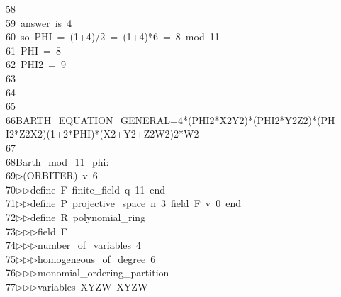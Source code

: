 \begin{tabbing}
58\>\\[0pt]
59\>\ answer\ is\ 4\\[0pt]
60\>\ so\ PHI\ =\ (1+4)/2\ =\ (1+4)*6\ =\ 8\ mod\ 11\\[0pt]
61\>\ PHI\ =\ 8\\[0pt]
62\>\ PHI2\ =\ 9\\[0pt]
63\>\\[0pt]
64\>\\[0pt]
65\>\\[0pt]
66\>BARTH\_EQUATION\_GENERAL=4*(PHI2*X2Y2)*(PHI2*Y2Z2)*(PH\\[0pt]
\>I2*Z2X2)(1+2*PHI)*(X2+Y2+Z2W2)2*W2\\[0pt]
67\>\\[0pt]
68\>Barth\_mod\_11\_phi:\\[0pt]
69\>$\triangleright$\>(ORBITER)\ v\ 6\ \\[0pt]
70\>$\triangleright$\>$\triangleright$\>define\ F\ finite\_field\ q\ 11\ end\ \\[0pt]
71\>$\triangleright$\>$\triangleright$\>define\ P\ projective\_space\ n\ 3\ field\ F\ v\ 0\ end\ \\[0pt]
72\>$\triangleright$\>$\triangleright$\>define\ R\ polynomial\_ring\ \\[0pt]
73\>$\triangleright$\>$\triangleright$\>$\triangleright$\>field\ F\ \\[0pt]
74\>$\triangleright$\>$\triangleright$\>$\triangleright$\>number\_of\_variables\ 4\ \\[0pt]
75\>$\triangleright$\>$\triangleright$\>$\triangleright$\>homogeneous\_of\_degree\ 6\ \\[0pt]
76\>$\triangleright$\>$\triangleright$\>$\triangleright$\>monomial\_ordering\_partition\ \\[0pt]
77\>$\triangleright$\>$\triangleright$\>$\triangleright$\>variables\ XYZW\ XYZW\ \\[0pt]

\end{tabbing}
